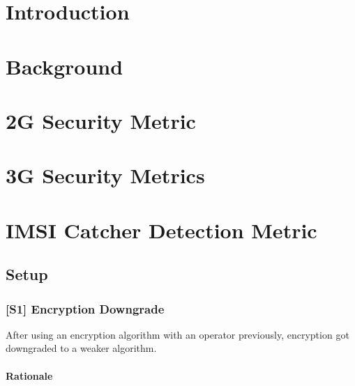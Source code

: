 \documentclass[a4paper,11pt,notitlepage,bigheadings,oneside]{scrartcl}
\begin{document}
\newcommand{\TBD}{{\color{srldark}\textbf{TBD}}}
\newcommand{\FIXME}[1]{{\color{srldark}\textit{FIXME: #1}\par}}

\maketitle
\pagebreak

\tableofcontents
\pagebreak

\section{Introduction}
\label{sec:introduction}

\section{Background}
\label{sec:background}


\section{2G Security Metric}
\label{sec:2g_security_metric}

\section{3G Security Metrics}
\label{sec:3g_security_metric}

\section{IMSI Catcher Detection Metric}
\label{sec:imsi_catcher_detection_metric}

\subsection{Setup}

\subsubsection{[S1] Encryption Downgrade}

After using an encryption algorithm with an operator previously, encryption got
downgraded to a weaker algorithm.

\paragraph{Rationale}
\end{document}

